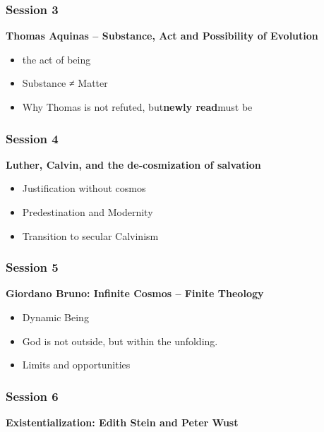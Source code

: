 \documentclass[
]{article}
\begin{document}
\subsubsection{\texorpdfstring{\textbf{Session 3}}{Session 3}}\label{session-3}

\textbf{Thomas Aquinas -- Substance, Act and Possibility of Evolution}

\begin{itemize}
\item
  the act of being
\item
  Substance ≠ Matter
\item
  Why Thomas is not refuted, but\textbf{newly read}must be
\end{itemize}

\subsubsection{\texorpdfstring{\textbf{Session 4}}{Session 4}}\label{session-4}

\textbf{Luther, Calvin, and the de-cosmization of salvation}

\begin{itemize}
\item
  Justification without cosmos
\item
  Predestination and Modernity
\item
  Transition to secular Calvinism
\end{itemize}

\subsubsection{\texorpdfstring{\textbf{Session 5}}{Session 5}}\label{session-5}

\textbf{Giordano Bruno: Infinite Cosmos -- Finite Theology}

\begin{itemize}
\item
  Dynamic Being
\item
  God is not outside, but within the unfolding.
\item
  Limits and opportunities
\end{itemize}

\subsubsection{\texorpdfstring{\textbf{Session 6}}{Session 6}}\label{session-6}

\textbf{Existentialization: Edith Stein and Peter Wust}
\end{document}
